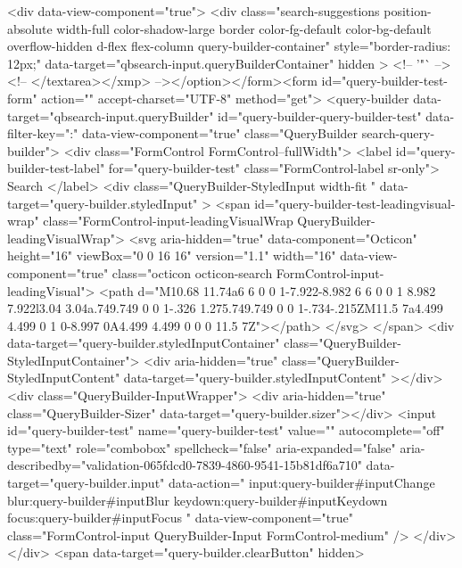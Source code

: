           <div data-view-component="true">        <div class="search-suggestions position-absolute width-full color-shadow-large border color-fg-default color-bg-default overflow-hidden d-flex flex-column query-builder-container"
          style="border-radius: 12px;"
          data-target="qbsearch-input.queryBuilderContainer"
          hidden
        >
          <!-- '"` --><!-- </textarea></xmp> --></option></form><form id="query-builder-test-form" action="" accept-charset="UTF-8" method="get">
  <query-builder data-target="qbsearch-input.queryBuilder" id="query-builder-query-builder-test" data-filter-key=":" data-view-component="true" class="QueryBuilder search-query-builder">
    <div class="FormControl FormControl--fullWidth">
      <label id="query-builder-test-label" for="query-builder-test" class="FormControl-label sr-only">
        Search
      </label>
      <div
        class="QueryBuilder-StyledInput width-fit "
        data-target="query-builder.styledInput"
      >
          <span id="query-builder-test-leadingvisual-wrap" class="FormControl-input-leadingVisualWrap QueryBuilder-leadingVisualWrap">
            <svg aria-hidden="true" data-component="Octicon" height="16" viewBox="0 0 16 16" version="1.1" width="16" data-view-component="true" class="octicon octicon-search FormControl-input-leadingVisual">
    <path d="M10.68 11.74a6 6 0 0 1-7.922-8.982 6 6 0 0 1 8.982 7.922l3.04 3.04a.749.749 0 0 1-.326 1.275.749.749 0 0 1-.734-.215ZM11.5 7a4.499 4.499 0 1 0-8.997 0A4.499 4.499 0 0 0 11.5 7Z"></path>
</svg>
          </span>
        <div data-target="query-builder.styledInputContainer" class="QueryBuilder-StyledInputContainer">
          <div
            aria-hidden="true"
            class="QueryBuilder-StyledInputContent"
            data-target="query-builder.styledInputContent"
          ></div>
          <div class="QueryBuilder-InputWrapper">
            <div aria-hidden="true" class="QueryBuilder-Sizer" data-target="query-builder.sizer"></div>
            <input id="query-builder-test" name="query-builder-test" value="" autocomplete="off" type="text" role="combobox" spellcheck="false" aria-expanded="false" aria-describedby="validation-065fdcd0-7839-4860-9541-15b81df6a710" data-target="query-builder.input" data-action="
          input:query-builder#inputChange
          blur:query-builder#inputBlur
          keydown:query-builder#inputKeydown
          focus:query-builder#inputFocus
        " data-view-component="true" class="FormControl-input QueryBuilder-Input FormControl-medium" />
          </div>
        </div>
          <span data-target="query-builder.clearButton" hidden>
